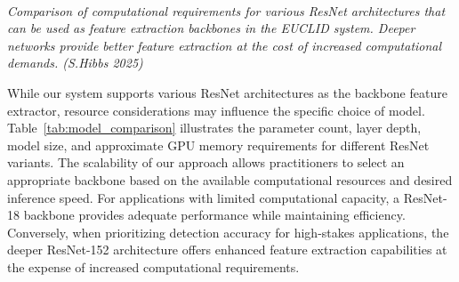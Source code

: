 \documentclass[conference]{IEEEtran}  %
\begin{document}
\begin{table}[t]
\centering
\caption{Computational Requirements for Different ResNet Backbones}
\label{tab:model_comparison}
\\[\baselineskip]
{\footnotesize \textit{Comparison of computational requirements for various ResNet architectures that can be used as feature extraction backbones in the EUCLID system. Deeper networks provide better feature extraction at the cost of increased computational demands. (S.Hibbs 2025)}}
\end{table}

While our system supports various ResNet architectures as the backbone feature extractor, resource considerations may influence the specific choice of model. Table~\ref{tab:model_comparison} illustrates the parameter count, layer depth, model size, and approximate GPU memory requirements for different ResNet variants. The scalability of our approach allows practitioners to select an appropriate backbone based on the available computational resources and desired inference speed. For applications with limited computational capacity, a ResNet-18 backbone provides adequate performance while maintaining efficiency. Conversely, when prioritizing detection accuracy for high-stakes applications, the deeper ResNet-152 architecture offers enhanced feature extraction capabilities at the expense of increased computational requirements.
\end{document}
